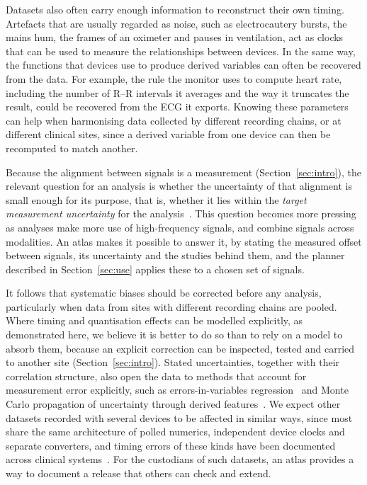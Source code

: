 \documentclass[11pt,a4paper]{article}
\begin{document}
Datasets also often carry enough information to reconstruct their own timing. Artefacts that are usually regarded as
noise, such as electrocautery bursts, the mains hum, the frames of an oximeter and pauses in ventilation, act as
clocks that can be used to measure the relationships between devices. In the same way, the functions that devices use
to produce derived variables can often be recovered from the data. For example, the rule the monitor uses to compute
heart rate, including the number of R--R intervals it averages and the way it truncates the result, could be
recovered from the ECG it exports. Knowing these parameters can help when harmonising data collected by different
recording chains, or at different clinical sites, since a derived variable from one device can then be recomputed to
match another.

Because the alignment between signals is a measurement (Section~\ref{sec:intro}), the relevant question for an
analysis is whether the uncertainty of that alignment is small enough for its purpose, that is, whether it lies within
the \emph{target measurement uncertainty} for the analysis~\citep{jcgm-200-2012}. This question becomes more pressing
as analyses make more use of high-frequency signals, and combine signals across modalities. An atlas makes it possible
to answer it, by stating the measured offset between signals, its uncertainty and the studies behind them, and the
planner described in Section~\ref{sec:use} applies these to a chosen set of signals.

It follows that systematic biases should be corrected before any analysis, particularly when data from sites with
different recording chains are pooled. Where timing and quantisation effects can be modelled explicitly, as
demonstrated here, we believe it is better to do so than to rely on a model to absorb them, because an explicit
correction can be inspected, tested and carried to another site (Section~\ref{sec:intro}). Stated uncertainties,
together with their correlation structure, also open the data to methods that account for measurement error
explicitly, such as errors-in-variables regression~\citep{hutcheon2010random,carroll2006measurement} and Monte Carlo
propagation of uncertainty through derived features~\citep{jcgm-101-2008}. We expect other datasets recorded with
several devices to be affected in similar ways, since most share the same architecture of polled numerics, independent
device clocks and separate converters, and timing errors of these kinds have been documented across clinical
systems~\citep{goodwin2022timing}. For the custodians of such datasets, an atlas provides a way to document a release
that others can check and extend.
\end{document}

